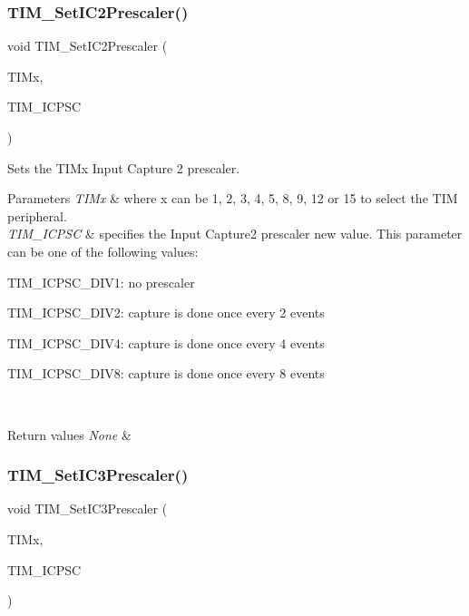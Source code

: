 \subsubsection{\texorpdfstring{TIM\_SetIC2Prescaler()}{TIM\_SetIC2Prescaler()}}
{\footnotesize\ttfamily void T\+I\+M\+\_\+\+Set\+I\+C2\+Prescaler (\begin{DoxyParamCaption}\item[{\mbox{\hyperlink{struct_t_i_m___type_def}{T\+I\+M\+\_\+\+Type\+Def}} $\ast$}]{T\+I\+Mx,  }\item[{uint16\+\_\+t}]{T\+I\+M\+\_\+\+I\+C\+P\+SC }\end{DoxyParamCaption})}



Sets the T\+I\+Mx Input Capture 2 prescaler. 


\begin{DoxyParams}{Parameters}
{\em T\+I\+Mx} & where x can be 1, 2, 3, 4, 5, 8, 9, 12 or 15 to select the T\+IM peripheral. \\
\hline
{\em T\+I\+M\+\_\+\+I\+C\+P\+SC} & specifies the Input Capture2 prescaler new value. This parameter can be one of the following values\+: \begin{DoxyItemize}
\item T\+I\+M\+\_\+\+I\+C\+P\+S\+C\+\_\+\+D\+I\+V1\+: no prescaler \item T\+I\+M\+\_\+\+I\+C\+P\+S\+C\+\_\+\+D\+I\+V2\+: capture is done once every 2 events \item T\+I\+M\+\_\+\+I\+C\+P\+S\+C\+\_\+\+D\+I\+V4\+: capture is done once every 4 events \item T\+I\+M\+\_\+\+I\+C\+P\+S\+C\+\_\+\+D\+I\+V8\+: capture is done once every 8 events \end{DoxyItemize}
\\
\hline
\end{DoxyParams}

\begin{DoxyRetVals}{Return values}
{\em None} & \\
\hline
\end{DoxyRetVals}
\mbox{\label{group___t_i_m___private___functions_ga76f906383b8132ebe00dffadb70cf7f9}} 
\subsubsection{\texorpdfstring{TIM\_SetIC3Prescaler()}{TIM\_SetIC3Prescaler()}}
{\footnotesize\ttfamily void T\+I\+M\+\_\+\+Set\+I\+C3\+Prescaler (\begin{DoxyParamCaption}\item[{\mbox{\hyperlink{struct_t_i_m___type_def}{T\+I\+M\+\_\+\+Type\+Def}} $\ast$}]{T\+I\+Mx,  }\item[{uint16\+\_\+t}]{T\+I\+M\+\_\+\+I\+C\+P\+SC }\end{DoxyParamCaption})}



